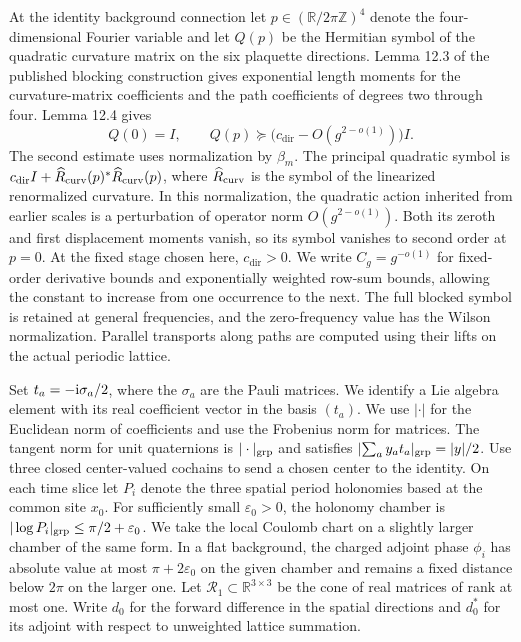 \documentclass[11pt,a4paper]{article}
\numberwithin{equation}{section}
\begin{document}
At the identity background connection let \(p\in(\mathbb R/2\pi\mathbb Z)^4\) denote the four-dimensional Fourier variable and let \(Q(p)\) be the Hermitian symbol of the quadratic curvature matrix on the six plaquette directions. Lemma 12.3 of the published blocking construction gives exponential length moments for the curvature-matrix coefficients and the path coefficients of degrees two through four. Lemma 12.4 gives
\begin{equation}
 Q(0)=I,\qquad Q(p)\succeq \bigl(c_{\mathrm{dir}}-O(g^{2-o(1)})\bigr)I .
 \label{eq:cam-soft-path}
\end{equation}
The second estimate uses normalization by \(\beta_m\). The principal quadratic symbol is \(c_{\mathrm{dir}}I+\widehat{R}_{\rm curv}(p)^*\widehat{R}_{\rm curv}(p)\), where \(\widehat{R}_{\rm curv}\) is the symbol of the linearized renormalized curvature. In this normalization, the quadratic action inherited from earlier scales is a perturbation of operator norm \(O(g^{2-o(1)})\). Both its zeroth and first displacement moments vanish, so its symbol vanishes to second order at \(p=0\). At the fixed stage chosen here, \(c_{\mathrm{dir}}>0\). We write \(C_g=g^{-o(1)}\) for fixed-order derivative bounds and exponentially weighted row-sum bounds, allowing the constant to increase from one occurrence to the next. The full blocked symbol is retained at general frequencies, and the zero-frequency value has the Wilson normalization. Parallel transports along paths are computed using their lifts on the actual periodic lattice. \cite[Lemmas 12.3--12.4]{armstrong}

Set \(t_a=-{\rm i}\sigma_a/2\), where the \(\sigma_a\) are the Pauli matrices. We identify a Lie algebra element with its real coefficient vector in the basis \((t_a)\). We use \(|\cdot|\) for the Euclidean norm of coefficients and use the Frobenius norm for matrices. The tangent norm for unit quaternions is \(|\cdot|_{\rm grp}\) and satisfies \(\lvert\sum_a y_a t_a\rvert_{\rm grp}=|y|/2\). Use three closed center-valued cochains to send a chosen center to the identity. On each time slice let \(P_i\) denote the three spatial period holonomies based at the common site \(x_0\). For sufficiently small \(\varepsilon_0>0\), the holonomy chamber is \(|\log P_i|_{\rm grp}\le \pi/2+\varepsilon_0\). We take the local Coulomb chart on a slightly larger chamber of the same form. In a flat background, the charged adjoint phase \(\phi_i\) has absolute value at most \(\pi+2\varepsilon_0\) on the given chamber and remains a fixed distance below \(2\pi\) on the larger one. Let \(\mathcal R_1\subset\mathbb R^{3\times3}\) be the cone of real matrices of rank at most one. Write \(d_0\) for the forward difference in the spatial directions and \(d_0^*\) for its adjoint with respect to unweighted lattice summation.
\end{document}

